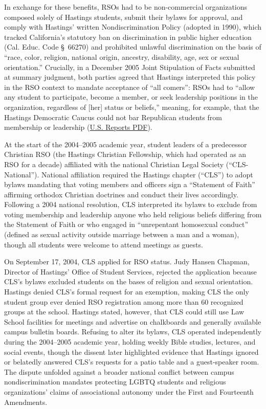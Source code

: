 \documentclass[12pt]{article}
\begin{document}
In exchange for these benefits, RSOs had to be non-commercial organizations composed solely of Hastings students, submit their bylaws for approval, and comply with Hastings' written Nondiscrimination Policy (adopted in 1990), which tracked California's statutory ban on discrimination in public higher education (Cal. Educ. Code \S~66270) and prohibited unlawful discrimination on the basis of ``race, color, religion, national origin, ancestry, disability, age, sex or sexual orientation.'' Crucially, in a December 2005 Joint Stipulation of Facts submitted at summary judgment, both parties agreed that Hastings interpreted this policy in the RSO context to mandate acceptance of ``all comers'': RSOs had to ``allow any student to participate, become a member, or seek leadership positions in the organization, regardless of [her] status or beliefs,'' meaning, for example, that the Hastings Democratic Caucus could not bar Republican students from membership or leadership (\href{https://tile.loc.gov/storage-services/service/ll/usrep/usrep561/usrep561661/usrep561661.pdf}{U.S. Reports PDF}).

At the start of the 2004--2005 academic year, student leaders of a predecessor Christian RSO (the Hastings Christian Fellowship, which had operated as an RSO for a decade) affiliated with the national Christian Legal Society (``CLS-National''). National affiliation required the Hastings chapter (``CLS'') to adopt bylaws mandating that voting members and officers sign a ``Statement of Faith'' affirming orthodox Christian doctrines and conduct their lives accordingly. Following a 2004 national resolution, CLS interpreted its bylaws to exclude from voting membership and leadership anyone who held religious beliefs differing from the Statement of Faith or who engaged in ``unrepentant homosexual conduct'' (defined as sexual activity outside marriage between a man and a woman), though all students were welcome to attend meetings as guests.

On September 17, 2004, CLS applied for RSO status. Judy Hansen Chapman, Director of Hastings' Office of Student Services, rejected the application because CLS's bylaws excluded students on the bases of religion and sexual orientation. Hastings denied CLS's formal request for an exemption, making CLS the only student group ever denied RSO registration among more than 60 recognized groups at the school. Hastings stated, however, that CLS could still use Law School facilities for meetings and advertise on chalkboards and generally available campus bulletin boards. Refusing to alter its bylaws, CLS operated independently during the 2004--2005 academic year, holding weekly Bible studies, lectures, and social events, though the dissent later highlighted evidence that Hastings ignored or belatedly answered CLS's requests for a patio table and a guest-speaker room. The dispute unfolded against a broader national conflict between campus nondiscrimination mandates protecting LGBTQ students and religious organizations' claims of associational autonomy under the First and Fourteenth Amendments.
\end{document}
